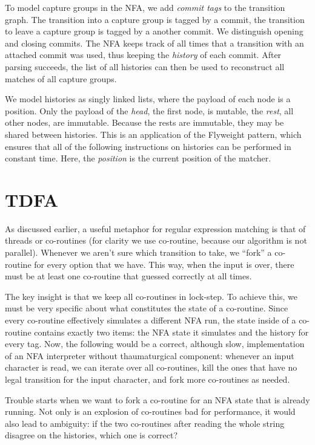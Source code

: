 \documentclass[11pt]{Thesis}
\theoremstyle{definition}
\newcommand{\seclabel}[1]{\label{sec:#1}}
\begin{document}
To model capture groups in the NFA, we add \emph{commit tags} to
the transition graph. The transition into a capture group is tagged
by a commit, the transition to leave a capture group is tagged by
a another commit. We distinguish opening and closing commits. The
NFA keeps track of all times that a transition with an attached
commit was used, thus keeping the \emph{history} of each commit.
After parsing succeeds, the list of all histories can then be used
to reconstruct all matches of all capture groups.

We model histories as singly linked lists, where the payload of each node is a
position.  Only the payload of the \emph{head}, the first node, is mutable, the
\emph{rest}, all other nodes, are immutable.  Because the rests are immutable,
they may be shared between histories.  This is an application of the Flyweight
pattern, which ensures that all of the following instructions on histories can
be performed in constant time. Here, the \emph{position} is the current
position of the matcher.

\section{TDFA}	\seclabel{dfa}

As discussed earlier, a useful metaphor for regular expression matching is that of 
threads\cite{Cox07a} or co-routines (for clarity we use 
co-routine, because our algorithm is not parallel).
Whenever we aren't sure which transition to take,
we ``fork'' a co-routine for every option that we have. This way, when
the input is over, there must be at least one co-routine that guessed
correctly at all times. 

The key insight is that we keep all co-routines in lock-step. To achieve this,
we must be very specific about what constitutes the state of a co-routine.
Since every co-routine effectively simulates a different NFA run, the state
inside of a co-routine contains exactly two items: the NFA state it simulates
and the history for every tag. Now, the following would be a correct, although
slow, implementation of an NFA interpreter without thaumaturgical component:
whenever an input character is read, we can iterate over all co-routines, kill
the ones that have no legal transition for the input character, and fork more
co-routines as needed.

Trouble starts when we want to fork a co-routine for an NFA state that
is already running. Not only is an explosion of co-routines bad for
performance, it would also lead to ambiguity: if the two co-routines
after reading the whole string disagree on the histories, which one is correct?
\end{document}
